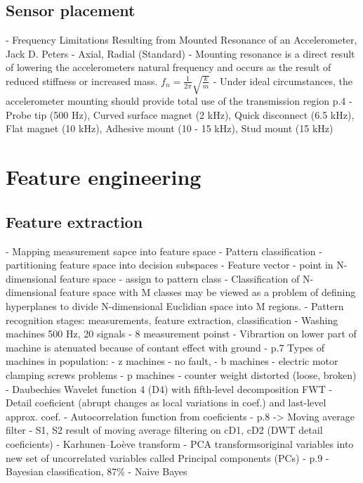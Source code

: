 \subsection{Sensor placement}  
- Frequency Limitations Resulting from Mounted Resonance of an Accelerometer, Jack D. Peters
- Axial, Radial (Standard)
- Mounting resonance is a direct result of lowering the accelerometers natural frequency and occurs as the result of reduced stiffness or increased mass. $f_n = \frac{1}{2\pi}\sqrt{\frac{k}{m}}$
- Under ideal circumstances, the accelerometer mounting should provide total use of the transmission region
p.4 - Probe tip (500 Hz), Curved surface magnet (2 kHz), Quick disconnect (6.5 kHz), Flat magnet (10 kHz), Adhesive mount (10 - 15 kHz), Stud mount (15 kHz)










\section{Feature engineering}


\subsection{Feature extraction}
\cite{goumas_classification_2002}
	- Mapping measurement sapce into feature space
	- Pattern classification - partitioning feature space into decision subspaces
	- Feature vector - point in N-dimensional feature space - assign to pattern class
	- Classification of N-dimensional feature space with M classes may be viewed as a problem of defining hyperplanes to divide N-dimensional Euclidian space into M regions.
	- Pattern recognition stages: measurements, feature extraction, classification
	- Washing machines 500 Hz, 20 signals
	- 8 measurement poinst - Vibrartion on lower part of machine is atenuated because of contant effect with ground - p.7
	Types of machines in population:		
		- z machines - no fault, 
		- b machines - electric motor clamping screws problems
		- p machines - counter weight distorted (loose, broken)
	- Daubechies Wavelet function 4 (D4) with fifth-level decomposition FWT  - Detail coeficient (abrupt changes as local variations in coef.) and last-level approx. coef.
	- Autocorrelation function from coeficients - p.8 -> Moving average filter
	- S1, S2 result of moving average filtering on cD1, cD2 (DWT detail coeficients) 
	- Karhunen–Loève transform - PCA transformsoriginal variables into new set of uncorrelated variables called Principal components (PCs) - p.9
	- Bayesian classification, 87\% - Naive Bayes

